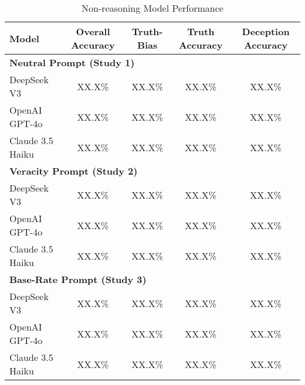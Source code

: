 \documentclass{article}
\begin{document}
\begin{table}[ht]
\centering
\caption{Non-reasoning Model Performance}
\begin{tabular}{lcccc}
\toprule
\textbf{Model} & \textbf{Overall Accuracy} & \textbf{Truth-Bias} & \textbf{Truth Accuracy} & \textbf{Deception Accuracy} \\
\midrule
\multicolumn{5}{l}{\textbf{Neutral Prompt (Study 1)}} \\
DeepSeek V3 & XX.X\% & XX.X\% & XX.X\% & XX.X\% \\
OpenAI GPT-4o & XX.X\% & XX.X\% & XX.X\% & XX.X\% \\
Claude 3.5 Haiku & XX.X\% & XX.X\% & XX.X\% & XX.X\% \\
\midrule
\multicolumn{5}{l}{\textbf{Veracity Prompt (Study 2)}} \\
DeepSeek V3 & XX.X\% & XX.X\% & XX.X\% & XX.X\% \\
OpenAI GPT-4o & XX.X\% & XX.X\% & XX.X\% & XX.X\% \\
Claude 3.5 Haiku & XX.X\% & XX.X\% & XX.X\% & XX.X\% \\
\midrule
\multicolumn{5}{l}{\textbf{Base-Rate Prompt (Study 3)}} \\
DeepSeek V3 & XX.X\% & XX.X\% & XX.X\% & XX.X\% \\
OpenAI GPT-4o & XX.X\% & XX.X\% & XX.X\% & XX.X\% \\
Claude 3.5 Haiku & XX.X\% & XX.X\% & XX.X\% & XX.X\% \\
\bottomrule
\end{tabular}
\label{tab:non_reasoning_performance}
\end{table}
\end{document}
